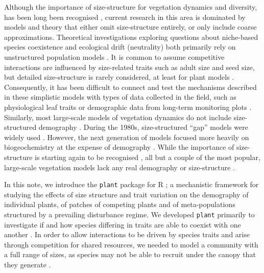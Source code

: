 \documentclass[a4paper,11pt]{article}
\newcommand{\plant}{\texttt{plant}}
\begin{document}
Although the importance of size-structure for vegetation dynamics and
diversity, has been long been recognised \citep[e.g.,][]{Harper-1977,
  Shugart-1980, Huston-1987}, current research in this area is
dominated by models and theory that either omit size-structure
entirely, or only include coarse approximations. 
%
Theoretical investigations exploring questions about niche-based
species coexistence and ecological drift (neutrality) both primarily
rely on unstructured population models \citep[e.g.][]{MacArthur-1967,
  Tilman-1985, Geritz-1995, Hubbell-2001, Calcagno-2006}.
%
It is common to assume competitive interactions are influenced by
size-related traits such as adult size and seed size, but detailed
size-structure is rarely considered, at least for plant models
\cite[for animal examples, see][]{Deroos-1988, Deroos-1992}.
%
Consequently, it has been difficult to connect and test the mechanisms
described in these simplistic models with types of data collected in
the field, such as physiological leaf traits or demographic data from
long-term monitoring plots \citep{Adler-2013}.
%
Similarly, most large-scale models of vegetation dynamics do not
include size-structured demography \citep{Cramer-2001, Sitch-2003,
  Purves-2008,Dekauwe-2014}.  During the 1980s, size-structured
``gap'' models were widely used
\citep[e.g.][]{Shugart-1980,Huston-1987}. However, the next generation
of models focused more heavily on biogeochemistry at the expense of
demography \citep[e.g.][]{Woodward-1995,Haxeltine-1996,Cramer-2001, 
Sitch-2003}. While the
importance of size-structure is starting again to be recognised
\citep{Moorcroft-2001, Purves-2008, Falster-2011, Dekauwe-2014}, all but a couple
of the most popular,
large-scale vegetation models lack any real demography or
size-structure \citep[e.g.][]{Moorcroft-2001, Smith-2014}.

In this note, we introduce the {\plant} package for R \citep{R-2015};
a mechanistic framework for studying the effects of size structure and
trait variation on the demography of individual plants, of patches of
competing plants and of meta-populations structured by a prevailing
disturbance regime.
% 
We developed {\plant} primarily to investigate if and how species
differing in traits are able to coexist with one another
\citep{Falster-2011,Falster-2015}.  In order to allow interactions to
be driven by species traits and arise through competition for shared
resources, we needed to model a community with a full range of sizes,
as species may not be able to recruit under the canopy that they
generate \citep{Moorcroft-2001,Huston-1987}.
\end{document}
